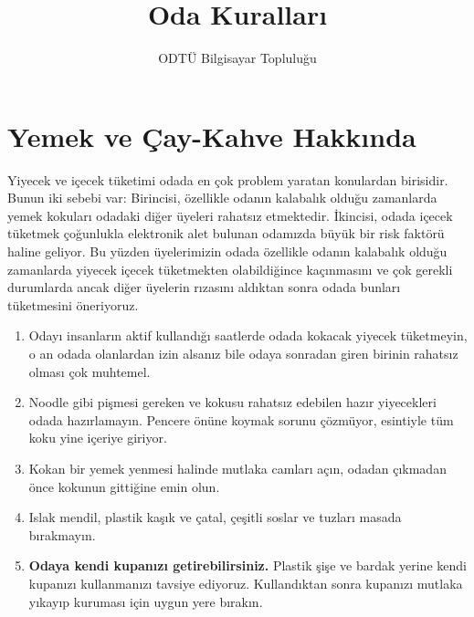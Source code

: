 \documentclass{article}
\title{Oda Kuralları}
\author{ODTÜ Bilgisayar Topluluğu}
\begin{document}
\maketitle



\section{Yemek ve Çay-Kahve Hakkında}

Yiyecek ve içecek tüketimi odada en çok problem yaratan konulardan birisidir.
Bunun iki sebebi var: Birincisi, özellikle odanın kalabalık olduğu zamanlarda
yemek kokuları odadaki diğer üyeleri rahatsız etmektedir. İkincisi, odada içecek
tüketmek çoğunlukla elektronik alet bulunan odamızda büyük bir risk faktörü haline geliyor. Bu yüzden üyelerimizin odada özellikle odanın kalabalık olduğu
zamanlarda yiyecek içecek tüketmekten olabildiğince kaçınmasını ve çok gerekli
durumlarda ancak diğer üyelerin rızasını aldıktan sonra odada bunları
tüketmesini öneriyoruz.
\begin{enumerate}
    \item Odayı insanların aktif kullandığı saatlerde odada kokacak yiyecek tüketmeyin, o an odada olanlardan izin alsanız bile odaya sonradan giren birinin rahatsız olması çok muhtemel.
    \item Noodle gibi pişmesi gereken ve kokusu rahatsız edebilen hazır yiyecekleri odada hazırlamayın. Pencere önüne koymak sorunu çözmüyor, esintiyle tüm koku yine içeriye giriyor.
    \item Kokan bir yemek yenmesi halinde mutlaka camları açın, odadan çıkmadan önce kokunun gittiğine emin olun.
    \item Islak mendil, plastik kaşık ve çatal, çeşitli soslar ve tuzları masada bırakmayın.
    \item \textbf{Odaya kendi kupanızı getirebilirsiniz.} Plastik şişe ve bardak yerine kendi kupanızı kullanmanızı tavsiye ediyoruz. Kullandıktan sonra kupanızı mutlaka yıkayıp kuruması için uygun yere bırakın.
\end{enumerate}
\end{document}
